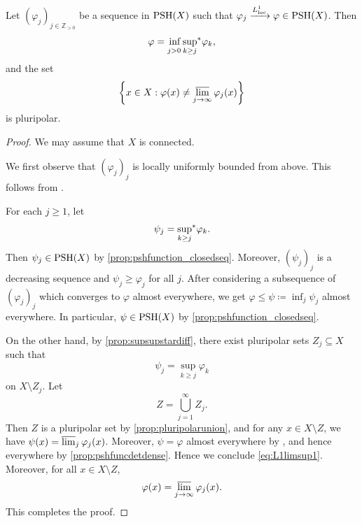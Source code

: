 \begin{corollary}\label{cor:L1limipp}
    Let $(\varphi_j)_{j\in \mathbb{Z}_{>0}}$ be a sequence in $\PSH(X)$ such that $\varphi_j\xrightarrow{L^1_{\loc}}\varphi\in \PSH(X)$. Then
    \begin{equation}\label{eq:L1limsup1}
        \varphi=\mathop{\vphantom{\operatorname{sup}^{*}}\inf}\limits_{j>0} \uscsup[k\geq j]\varphi_k,
    \end{equation} and the set
    \[
        \left\{x\in X: \varphi(x)\neq \varlimsup_{j\to\infty}\varphi_j(x)\right\}
    \]
    is pluripolar.
\end{corollary}
\begin{proof}
    We may assume that $X$ is connected.

    We first observe that $(\varphi_j)_j$ is locally uniformly bounded from above. This follows from \cite[Exercise~1.20]{GZ17}.

    For each $j\geq 1$, let
    \[
        \psi_j=\uscsup[k\geq j]\varphi_k.
    \]
    Then $\psi_j\in \PSH(X)$ by \cref{prop:pshfunction_closedseq}. Moreover, $(\psi_j)_j$ is a decreasing sequence and $\psi_j\geq \varphi_j$ for all $j$.
    After considering a subsequence of $(\varphi_j)_j$ which converges to $\varphi$ almost everywhere, we get $\varphi\leq \psi\coloneqq \inf_j \psi_j$ almost everywhere. In particular, $\psi\in \PSH(X)$ by \cref{prop:pshfunction_closedseq}.

    On the other hand, by \cref{prop:supsupstardiff}, there exist pluripolar sets $Z_j\subseteq X$ such that
    \[
    \psi_j=\sup_{k\geq j}\varphi_k
    \]
    on $X\setminus Z_j$. Let
    \[
    Z=\bigcup_{j=1}^{\infty} Z_j.
    \]
    Then $Z$ is a pluripolar set by \cref{prop:pluripolarunion}, and for any $x\in X\setminus Z$, we have $\psi(x)=\varlimsup_j \varphi_j(x)$.
    Moreover, $\psi=\varphi$ almost everywhere by \cite[Theorem~1.46]{GZ17}, and hence everywhere by \cref{prop:pshfuncdetdense}. Hence we conclude \eqref{eq:L1limsup1}.
    Moreover, for all $x\in X\setminus Z$,
    \[
        \varphi(x)=\varlimsup_{j\to\infty}  \varphi_j(x).
    \]
    This completes the proof.
\end{proof}


